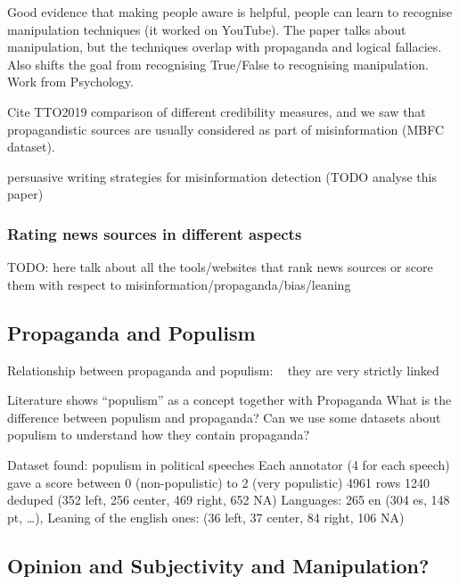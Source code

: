 \cite{roozenbeek2022countering} Good evidence that making people aware is helpful, people can learn to recognise manipulation techniques (it worked on YouTube). The paper talks about manipulation, but the techniques overlap with propaganda and logical fallacies. Also shifts the goal from recognising True/False to recognising manipulation. Work from Psychology.

Cite TTO2019 comparison of different credibility measures, and we saw that propagandistic sources are usually considered as part of misinformation (MBFC dataset).


\cite{romain2022misinformation} persuasive writing strategies for misinformation detection (TODO analyse this paper)

\subsubsection{Rating news sources in different aspects}

TODO: here talk about all the tools/websites that rank news sources or score them with respect to misinformation/propaganda/bias/leaning

\subsection{Propaganda and Populism}

Relationship between propaganda and populism:
~\cite{tumber2021routledge,pasquino2008populism}
they are very strictly linked


Literature shows “populism” as a concept together with Propaganda
What is the difference between populism and propaganda?
Can we use some datasets about populism to understand how they contain propaganda?

Dataset found: populism in political speeches %
Each annotator (4 for each speech) gave a score between 0 (non-populistic) to 2 (very populistic)
4961 rows 
1240 deduped (352 left, 256 center, 469 right, 652 NA)
Languages: 265 en (304 es, 148 pt, …),
Leaning of the english ones: (36 left, 37 center, 84 right, 106 NA)


\subsection{Opinion and Subjectivity and Manipulation?}

